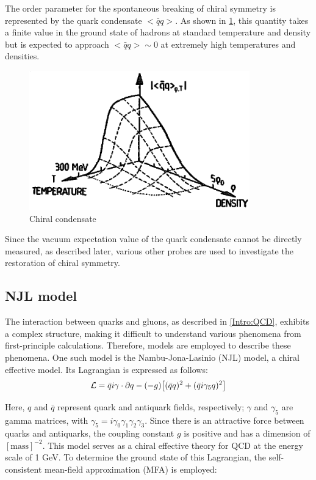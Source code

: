         The order parameter for the spontaneous breaking of chiral symmetry is represented by the quark condensate $< \bar{q}q >$. As shown in \ref{quark_condensate}, this quantity takes a finite value in the ground state of hadrons at standard temperature and density but is expected to approach $< \bar{q}q > \sim 0$ at extremely high temperatures and densities.  
        \begin{figure}[htbp]  
            \centering  
            \includegraphics[keepaspectratio, scale=0.6]{fig/1_1_quark_condensate.png}  
            \caption{Chiral condensate\cite{Weise:1993ax}}  
            \label{quark_condensate}  
        \end{figure}  
        
        Since the vacuum expectation value of the quark condensate cannot be directly measured, as described later, various other probes are used to investigate the restoration of chiral symmetry.
    \subsection{NJL model}
    \label{NJL model}  
        The interaction between quarks and gluons, as described in \ref{Intro:QCD}, exhibits a complex structure, making it difficult to understand various phenomena from first-principle calculations. Therefore, models are employed to describe these phenomena. One such model is the Nambu-Jona-Lasinio (NJL) model, a chiral effective model. Its Lagrangian is expressed as follows:  
        \begin{eqnarray}
            \label{NJLmodel}
            \mathcal{L}=\bar{q}i\gamma \cdot \partial q -(-g)\qty[(\bar{q}q)^2+(\bar{q}i\gamma_5q)^2]
        \end{eqnarray}
        
        Here, $q$ and $\bar{q}$ represent quark and antiquark fields, respectively; $\gamma$ and $\gamma_5$ are gamma matrices, with $\gamma_5 = i \gamma_0 \gamma_1 \gamma_2 \gamma_3$. Since there is an attractive force between quarks and antiquarks, the coupling constant $g$ is positive and has a dimension of $[\text{mass}]^{-2}$.  
        This model serves as a chiral effective theory for QCD at the energy scale of 1 GeV. To determine the ground state of this Lagrangian, the self-consistent mean-field approximation (MFA) is employed:  
        
